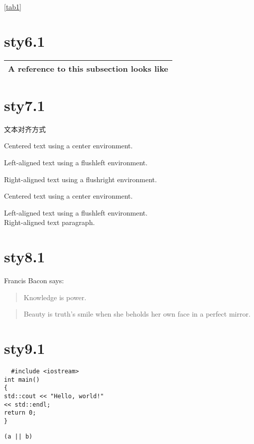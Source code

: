 \documentclass{article}
\begin{document}
\ref{tab1}
\pageref{tab1}


\section{sty6.1}%
\begin{tabular}{l}
\hline
A reference to this subsection looks like\footnotemark\\
\hline
\end{tabular}



\section{sty7.1}文本对齐方式
\begin{center}
  Centered text using a center environment.
\end{center}

\begin{flushleft}
  Left-aligned text using a flushleft environment.
\end{flushleft}

\begin{flushright}
  Right-aligned text using a flushright environment.
\end{flushright}

\centering
 Centered text using a center environment.\\
\raggedright
Left-aligned text using a flushleft environment.\\
\raggedleft
Right-aligned text paragraph.\\

\raggedright
\section{sty8.1}%
Francis Bacon says:
\begin{quote}
  Knowledge is power.
\end{quote}

\begin{quotation}
Beauty is truth’s smile when she beholds her own face in a perfect mirror.
\end{quotation}


\section{sty9.1}%
\begin{verbatim}
  #include <iostream>
int main()
{
std::cout << "Hello, world!"
<< std::endl;
return 0;
}
\end{verbatim}

\verb+(a || b)+
\end{document}
